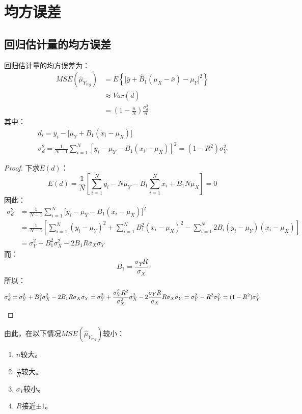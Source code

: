 \section{均方误差}

\subsection{回归估计量的均方误差}
\begin{theorem}
	回归估计量的均方误差为：
	\begin{align*}
		MSE(\hat{\mu}_{Y_{reg}})&= 
		E\left\lbrace\big[\bar{y}+\hat{B}_1(\mu_X-\bar{x})-\mu_Y\big]^2\right\rbrace  \\
		&\approx Var(\bar{d}) \\
		&=\left(1-\frac{n}{N}\right)\frac{\sigma_d^2}{n}
	\end{align*}
	其中：
	\begin{gather*}
		d_i=y_i-\big[\mu_Y+B_1(x_i-\mu_X)\big] \\
		\sigma_d^2=\frac{1}{N-1}\sum_{i=1}^N[y_i-\mu_Y-B_1(x_i-\mu_X)]^2=(1-R^2)\sigma_Y^2
	\end{gather*}
\end{theorem}
\begin{proof}
	下求$E(d)$：
	\begin{equation*}
		E(d)=\frac{1}{N}\left[\sum_{i=1}^Ny_i-N\mu_Y-B_1\sum_{i=1}^Nx_i+B_1N\mu_X\right]=0
	\end{equation*}
	因此：
	\begin{align*}
		\sigma_d^2&=\frac{1}{N-1}\sum_{i=1}^N\big[y_i-\mu_Y-B_1(x_i-\mu_X)\big]^2 \\
		&=\frac{1}{N-1}\left[\sum_{i=1}^N(y_i-\mu_Y)^2+\sum_{i=1}^NB_1^2(x_i-\mu_X)^2-\sum_{i=1}^N2B_i(y_i-\mu_Y)(x_i-\mu_X)\right] \\
		&=\sigma_Y^2+B_1^2\sigma_X^2-2B_1R\sigma_X\sigma_Y
	\end{align*}
	而：
	\begin{equation*}
		B_1=\frac{\sigma_YR}{\sigma_X}
	\end{equation*}
	所以：
	\begin{equation*}
		\sigma_d^2
		=\sigma_Y^2+B_1^2\sigma_X^2-2B_1R\sigma_X\sigma_Y 
		=\sigma_Y^2+\frac{\sigma_Y^2R^2}{\sigma_X^2}\sigma_X^2-2\frac{\sigma_YR}{\sigma_X}R\sigma_X\sigma_Y
		=\sigma_Y^2-R^2\sigma_Y^2
		=(1-R^2)\sigma_Y^2\qedhere
	\end{equation*}
\end{proof}
由此，在以下情况$MSE(\hat{\mu}_{Y_{reg}})$较小：
\begin{enumerate}
	\item $n$较大。
	\item $\frac{n}{N}$较大。
	\item $\sigma_Y$较小。
	\item $R$接近$\pm 1$。
\end{enumerate}



